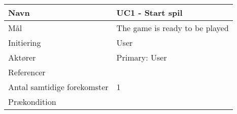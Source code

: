 \begin{table}[]
    \centering
    
\begin{tabular}[]{@{}ll@{}}
\hline
\hline

\begin{minipage}[t]{0.47\columnwidth}\raggedright
{Navn}\strut
\end{minipage} & \begin{minipage}[t]{0.47\columnwidth}\raggedright
{UC1 - Start spil}\strut
\end{minipage}\tabularnewline
\hline
\begin{minipage}[t]{0.47\columnwidth}\raggedright
{Mål}\strut
\end{minipage} & \begin{minipage}[t]{0.47\columnwidth}\raggedright
{The game is ready to be played}\strut
\end{minipage}\tabularnewline
\hline
\begin{minipage}[t]{0.47\columnwidth}\raggedright
{Initiering}\strut
\end{minipage} & \begin{minipage}[t]{0.47\columnwidth}\raggedright
{User}\strut
\end{minipage}\tabularnewline
\hline
\begin{minipage}[t]{0.47\columnwidth}\raggedright
{Aktører}\strut
\end{minipage} & \begin{minipage}[t]{0.47\columnwidth}\raggedright
{Primary: User}\strut
\end{minipage}\tabularnewline
\hline
\begin{minipage}[t]{0.47\columnwidth}\raggedright
{Referencer}\strut
\end{minipage} & \begin{minipage}[t]{0.47\columnwidth}\raggedright
{}\strut
\end{minipage}\tabularnewline
\hline
\begin{minipage}[t]{0.47\columnwidth}\raggedright
{Antal samtidige forekomster}\strut
\end{minipage} & \begin{minipage}[t]{0.47\columnwidth}\raggedright
{1}\strut
\end{minipage}\tabularnewline
\hline
\begin{minipage}[t]{0.47\columnwidth}\raggedright
{Prækondition}\strut
\end{minipage} & \begin{minipage}[t]{0.47\columnwidth}\raggedright

\end{minipage}
\end{tabular}
\end{table}

